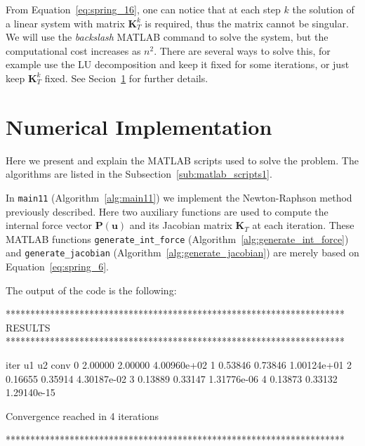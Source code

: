 \smallskip

\begin{marker}
From Equation~\eqref{eq:spring_16}, one can notice that at each step $k$ the solution of a linear system with matrix $\mathbf{K}_T^k$ is required, thus the matrix cannot be singular. We will use the \emph{backslash} MATLAB command to solve the system, but the computational cost increases as $n^2$. There are several ways to solve this, for example use the LU decomposition and keep it fixed for some iterations, or just keep $\mathbf{K}_T^k$ fixed. See Secion~\ref{sec:numerical_implementation1} for further details.
\end{marker}

\newpage

\section{Numerical Implementation}
\label{sec:numerical_implementation1}%

Here we present and explain the MATLAB scripts used to solve the problem. The algorithms are listed in the Subsection~\ref{sub:matlab_scripts1}.

In \texttt{main11} (Algorithm~\ref{alg:main11}) we implement the Newton-Raphson method previously described. Here two auxiliary functions are used to compute the internal force vector $\mathbf{P}(\mathbf{u})$ and its Jacobian matrix $\mathbf{K}_T$ at each iteration. These MATLAB functions \newline
\texttt{generate\_int\_force} (Algorithm~\ref{alg:generate_int_force}) and \texttt{generate\_jacobian} (Algorithm~\ref{alg:generate_jacobian}) are merely based on Equation~\eqref{eq:spring_6}.

The output of the code is the following:
\begin{matlaboutput}
*********************************************************************
RESULTS
*********************************************************************

iter   u1        u2        conv
   0   2.00000   2.00000   4.00960e+02
   1   0.53846   0.73846   1.00124e+01
   2   0.16655   0.35914   4.30187e-02
   3   0.13889   0.33147   1.31776e-06
   4   0.13873   0.33132   1.29140e-15

Convergence reached in 4 iterations

*********************************************************************
\end{matlaboutput}

